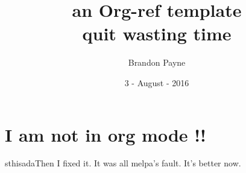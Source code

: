 \documentclass[koma, a4paper, utopia, 12pt]{article}
\author{Brandon Payne}
\date{3 - August - 2016}
\title{an Org-ref template\\\medskip
\large quit wasting time}
\begin{document}
\maketitle


\section{I am not in org mode !!}
\label{sec:orgheadline1}

sthisadaThen I fixed it.
It was all melpa's fault.  It's better now.
\end{document}
